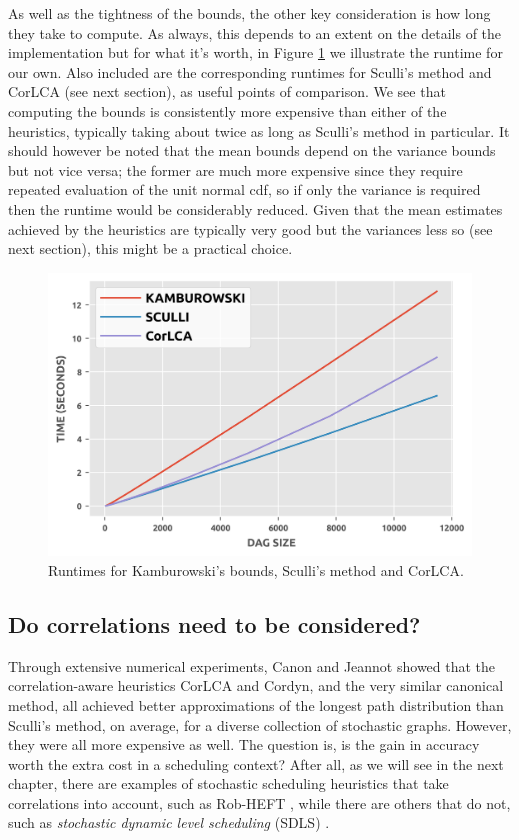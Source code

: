 \documentclass[12pt]{article}
\begin{document}
      As well as the tightness of the bounds, the other key consideration is how long they take to compute. As always, this depends to an extent on the details of the implementation but for what it's worth, in Figure \ref{plot.existing_timings} we illustrate the runtime for our own. Also included are the corresponding runtimes for Sculli's method and CorLCA (see next section), as useful points of comparison. We see that computing the bounds is consistently more expensive than either of the heuristics, typically taking about twice as long as Sculli's method in particular. It should however be noted that the mean bounds depend on the variance bounds but not vice versa; the former are much more expensive since they require repeated evaluation of the unit normal cdf, so if only the variance is required then the runtime would be considerably reduced. Given that the mean estimates achieved by the heuristics are typically very good but the variances less so (see next section), this might be a practical choice.

      \begin{figure}
	\centering	
	\includegraphics[scale=1.0]{existing_timings.png}
	\caption{Runtimes for Kamburowski's bounds, Sculli's method and CorLCA.}	
	\label{plot.existing_timings}
      \end{figure}

      \subsection{Do correlations need to be considered?}
      \label{subsect.results_correlations}

      Through extensive numerical experiments, Canon and Jeannot showed that the correlation-aware heuristics CorLCA and Cordyn, and the very similar canonical method, all achieved better approximations of the longest path distribution than Sculli's method, on average, for a diverse collection of stochastic graphs. However, they were all more expensive as well. The question is, is the gain in accuracy worth the extra cost in a scheduling context? After all, as we will see in the next chapter, there are examples of stochastic scheduling heuristics that take correlations into account, such as Rob-HEFT \cite{can10}, while there are others that do not, such as {\em stochastic dynamic level scheduling} (SDLS) \cite{li15}.      
\end{document}
